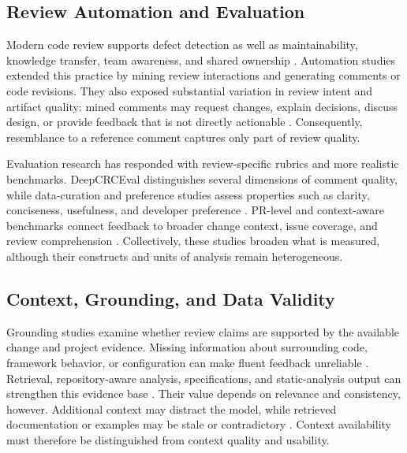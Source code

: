 \documentclass[10pt]{article}
\begin{document}
\subsection{Review Automation and Evaluation}

Modern code review supports defect detection as well as maintainability, knowledge transfer, team awareness, and shared ownership \cite{p37_sadowski2018_google_mcr,p38_bacchelli2013_expectations_mcr,p39_bosu2015_useful_reviews,p51_davila2021_mcr_slr_taxonomy}. Automation studies extended this practice by mining review interactions and generating comments or code revisions. They also exposed substantial variation in review intent and artifact quality: mined comments may request changes, explain decisions, discuss design, or provide feedback that is not directly actionable \cite{p14_li2022_codereviewer,p52_tufano2021_automating_code_review_activities,p53_tufano2024_code_review_automation_strengths_weaknesses}. Consequently, resemblance to a reference comment captures only part of review quality.

Evaluation research has responded with review-specific rubrics and more realistic benchmarks. DeepCRCEval distinguishes several dimensions of comment quality, while data-curation and preference studies assess properties such as clarity, conciseness, usefulness, and developer preference \cite{p01_lu2025_deepcrceval,p18_bensghaier2025_curated_reviews,p30_weyssow2025_codeultrafeedback}. PR-level and context-aware benchmarks connect feedback to broader change context, issue coverage, and review comprehension \cite{p04_kumar2026_swe_prbench,p05_zeng2025_swrbench,p06_hu2025_contextcrbench,p17_lin2025_codereviewqa}. Collectively, these studies broaden what is measured, although their constructs and units of analysis remain heterogeneous.

\subsection{Context, Grounding, and Data Validity}

Grounding studies examine whether review claims are supported by the available change and project evidence. Missing information about surrounding code, framework behavior, or configuration can make fluent feedback unreliable \cite{p02_tantithamthavorn2026_hallujudge,p03_tantithamthavorn2026_rovodev,p07_olewicki2024_revmate}. Retrieval, repository-aware analysis, specifications, and static-analysis output can strengthen this evidence base \cite{p11_zhang2025_laura,p12_wang2025_sgcr,p16_icoz2026_context_aware,p20_hong2025_rag_reviewer,p22_jaoua2025_static_analyzers}. Their value depends on relevance and consistency, however. Additional context may distract the model, while retrieved documentation or examples may be stale or contradictory \cite{p04_kumar2026_swe_prbench,p13_haider2024_prompting_finetuning,p40_ram2018_reviewability,p49_lee2025_metamon}. Context availability must therefore be distinguished from context quality and usability.
\end{document}
